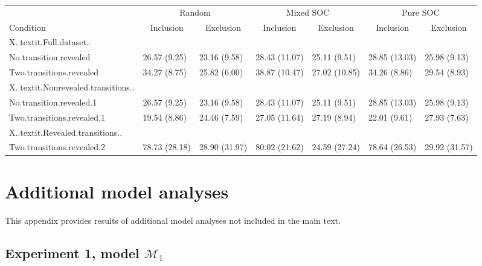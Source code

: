 \documentclass[english,,man]{apa6}
\begin{document}
\begin{appendix}
\begin{table}[hp]
\begin{center}
\begin{threeparttable}
\begin{tabular}{lllllll}
\toprule
& \multicolumn{2}{c}{Random} & \multicolumn{2}{c}{Mixed SOC} & \multicolumn{2}{c}{Pure SOC} \\
\cmidrule(r){2-3} \cmidrule(r){4-5} \cmidrule(r){6-7}
Condition & \multicolumn{1}{c}{Inclusion} & \multicolumn{1}{c}{Exclusion} & \multicolumn{1}{c}{Inclusion} & \multicolumn{1}{c}{Exclusion} & \multicolumn{1}{c}{Inclusion} & \multicolumn{1}{c}{Exclusion}\\
\midrule
X..textit.Full.dataset.. &  &  &  &  &  & \\
No.transition.revealed & 26.57 (9.25) & 23.16 (9.58) & 28.43 (11.07) & 25.11 (9.51) & 28.85 (13.03) & 25.98 (9.13)\\
Two.transitions.revealed & 34.27 (8.75) & 25.82 (6.00) & 38.87 (10.47) & 27.02 (10.85) & 34.26 (8.86) & 29.54 (8.93)\\
X..textit.Nonrevealed.transitions.. &  &  &  &  &  & \\
No.transition.revealed.1 & 26.57 (9.25) & 23.16 (9.58) & 28.43 (11.07) & 25.11 (9.51) & 28.85 (13.03) & 25.98 (9.13)\\
Two.transitions.revealed.1 & 19.54 (8.86) & 24.46 (7.59) & 27.05 (11.64) & 27.19 (8.94) & 22.01 (9.61) & 27.93 (7.63)\\
X..textit.Revealed.transitions.. &  &  &  &  &  & \\
Two.transitions.revealed.2 & 78.73 (28.18) & 28.90 (31.97) & 80.02 (21.62) & 24.59 (27.24) & 78.64 (26.53) & 29.92 (31.57)\\
\bottomrule
\end{tabular}

\end{threeparttable}
\end{center}

\end{table}

\hypertarget{additional-model-analyses}{%
\section{Additional model analyses}\label{additional-model-analyses}}

\setlength{\parindent}{0.5in}
\setlength{\leftskip}{0in}
\setlength{\parskip}{0pt}

This appendix provides results of additional model analyses not included
in the main text.

\hypertarget{experiment-1-model-mathcalm_1}{%
\subsection{\texorpdfstring{Experiment 1, model
\(\mathcal{M}_1\)}{Experiment 1, model \textbackslash{}mathcal\{M\}\_1}}\label{experiment-1-model-mathcalm_1}}


\end{appendix}
\end{document}
